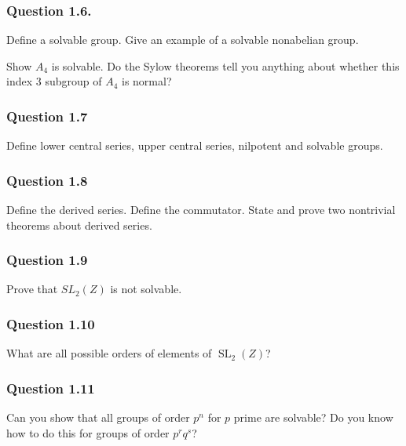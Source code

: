 \hypertarget{question-1.6.}{%
\subsubsection{Question 1.6.}\label{question-1.6.}}

Define a solvable group. Give an example of a solvable nonabelian group.

Show \(A_4\) is solvable. Do the Sylow theorems tell you anything about
whether this index 3 subgroup of \(A_4\) is normal?

\hypertarget{question-1.7}{%
\subsubsection{Question 1.7}\label{question-1.7}}

Define lower central series, upper central series, nilpotent and
solvable groups.

\hypertarget{question-1.8}{%
\subsubsection{Question 1.8}\label{question-1.8}}

Define the derived series. Define the commutator. State and prove two
nontrivial theorems about derived series.

\hypertarget{question-1.9}{%
\subsubsection{Question 1.9}\label{question-1.9}}

Prove that \(SL_2(Z)\) is not solvable.

\hypertarget{question-1.10}{%
\subsubsection{Question 1.10}\label{question-1.10}}

What are all possible orders of elements of
\({\operatorname{SL}}_2(Z)\)?

\hypertarget{question-1.11}{%
\subsubsection{Question 1.11}\label{question-1.11}}

Can you show that all groups of order \(p^n\) for \(p\) prime are
solvable? Do you know how to do this for groups of order \(p^r q^s\)?

